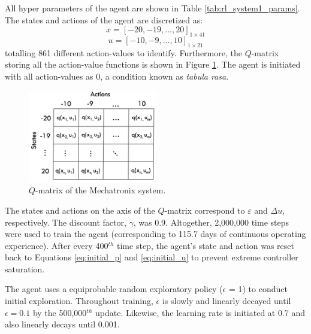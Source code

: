 All hyper parameters of the agent are shown in Table \ref{tab:rl_system1_params}. The states and actions of the agent are discretized as:
\begin{equation}
    x = [-20, -19, ..., 20]_{1 \times 41}
\end{equation}
\begin{equation}
    u = [-10, -9, ..., 10]_{1 \times 21}
\end{equation}
totalling 861 different action-values to identify. Furthermore, the $Q$-matrix storing all the action-value functions is shown in Figure \ref{fig:q_matrix_system1}.  The agent is initiated with all action-values as 0, a condition known as \textit{tabula rasa}.
\begin{figure}[H]
    \centering
    \includegraphics[width=0.5\textwidth]{images/ch4/q_matrix_system1.jpeg}
    \caption{$Q$-matrix of the Mechatronix system.}
    \label{fig:q_matrix_system1}
\end{figure}
The states and actions on the axis of the $Q$-matrix correspond to $\varepsilon$ and $\Delta u$, respectively.  The discount factor, $\gamma$, was 0.9. Altogether, 2,000,000 time steps were used to train the agent (corresponding to 115.7 days of continuous operating experience). After every 400$^{th}$ time step, the agent's state and action was reset back to Equations \ref{eq:initial_p} and \ref{eq:initial_u} to prevent extreme controller saturation. 

The agent uses a equiprobable random exploratory policy ($\epsilon$ = 1) to conduct initial exploration. Throughout training, $\epsilon$ is slowly and linearly decayed until $\epsilon = 0.1$ by the 500,000$^{th}$ update. Likewise, the learning rate is initiated at 0.7 and also linearly decays until 0.001.

